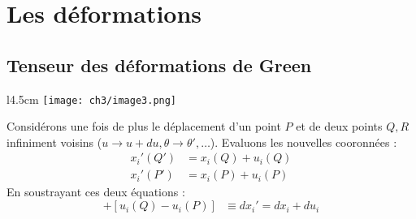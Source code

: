        
      
      
      
      
\section{Les déformations}
    
    \subsection{Tenseur des déformations de Green}
    \begin{wrapfigure}[9]{l}{4.5cm}
    \texttt{[image: ch3/image3.png]}
    \end{wrapfigure}
    Considérons une fois de plus le déplacement d'un point $P$ et de deux points $Q,R$ infiniment
     voisins ($u \rightarrow u+du, \theta \rightarrow \theta', \dots$). Evaluons les nouvelles 
     cooronnées :
     \begin{equation}
     \begin{array}{ll}
     x_i'(Q') &= x_i(Q) + u_i(Q) \\
     x_i'(P') &= x_i(P) + u_i(P) 
     \end{array}
     \end{equation}
     En soustrayant ces deux équations :
     \begin{equation}
     [x_i'(Q') - x_i'(P')] [x_i(Q)-x_i(P)]+[u_i(Q) - u_i(P)]\ \ \ \equiv dx_i' = dx_i + du_i
     \end{equation}
     
